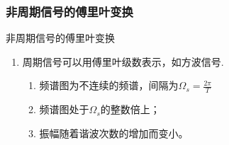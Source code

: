 \documentclass[notheorems,compress,mathserif,table]{beamer}
\begin{document}
\begin{frame}[shrink]\frametitle{非周期信号的傅里叶变换}%

   非周期信号的傅里叶变换
   \begin{enumerate}
     \item 周期信号可以用傅里叶级数表示，如方波信号.
           \newline\newline\newline\newline\newline\newline
         \begin{enumerate}[\textbf{注：}]
           \item 频谱图为不连续的频谱，间隔为$\Omega_s = \frac{2\pi}{T}$
           \item 频谱图处于$\Omega_s$的整数倍上；
           \item 振幅随着谐波次数的增加而变小。
         \end{enumerate}
    \end{enumerate}
\end{frame}
\end{document}
